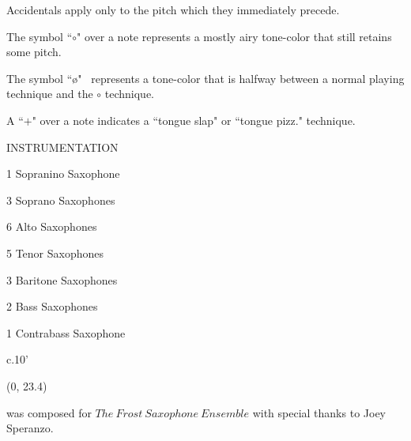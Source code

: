 \documentclass[10pt]{article}
\begin{document}
\begin{center}
Accidentals apply only to the pitch which they immediately precede.
\end{center}

\begin{center}
The symbol ``$\circ$" over a note represents a mostly airy tone-color that still retains some pitch.
\end{center}

\begin{center}
The symbol ``\o" \ represents a tone-color that is halfway between a normal playing technique and the $\circ$ technique.
\end{center}

\begin{center}
A ``$+$" over a note indicates a ``tongue slap" or ``tongue pizz." technique.
\end{center}

\vspace*{6\baselineskip}

\begin{center}
\huge INSTRUMENTATION
\end{center}
\begin{center}
1 Sopranino Saxophone
\end{center}
\begin{center}
3 Soprano Saxophones
\end{center}
\begin{center}
6 Alto Saxophones
\end{center}
\begin{center}
5 Tenor Saxophones
\end{center}
\begin{center}
3 Baritone Saxophones
\end{center}
\begin{center}
2 Bass Saxophones
\end{center}
\begin{center}
1 Contrabass Saxophone
\end{center}

\vspace*{7\baselineskip}

\begin{center}
c.10'
\end{center}

\begin{textblock}{23}(0, 23.4)
\begin{center}
 was composed for $The \ Frost \ Saxophone \ Ensemble$ with special thanks to Joey Speranzo.
\end{center}
\end{textblock}
\end{document}
